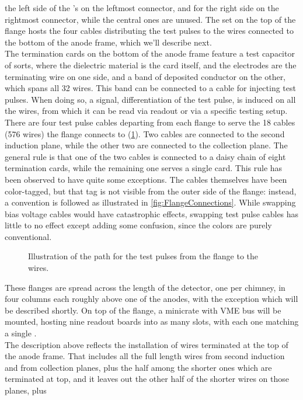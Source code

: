 the left side of the \DBB's on the leftmost connector, and for the right side on
the rightmost connector, while the central ones are unused.
The set on the top of the flange hosts the four cables distributing the test
pulses to the wires connected to the bottom of the anode frame, which we'll
describe next.
\\
The termination cards on the bottom of the anode frame feature a test capacitor
of sorts, where the dielectric material is the card itself, and the electrodes
are the terminating wire on one side, and a band of deposited conductor on the
other, which spans all 32 wires.
This band can be connected to a cable for injecting test pulses.
When doing so, a signal, differentiation of the test pulse, is induced on all
the wires, from which it can be read via readout or via a specific testing
setup.
There are four test pulse cables departing from each flange to serve the 18
cables (576 wires) the flange connects to (\cref{fig:PulseCables}).
Two cables are connected to the second induction plane, while the other two are
connected to the collection plane.
The general rule is that one of the two cables is connected to a daisy chain of
eight termination cards, while the remaining one serves a single card.
This rule has been observed to have quite some exceptions.
The cables themselves have been color-tagged, but that tag is not visible from
the outer side of the flange: instead, a convention is followed as illustrated
in \cref{fig:FlangeConnections}.
While swapping bias voltage cables would have catastrophic effects, swapping
test pulse cables has little to no effect except adding some confusion, since
the colors are purely conventional.
\begin{figure}
  \caption{\label{fig:PulseCables}
    Illustration of the path for the test pulses from the flange to the wires.
  }
\end{figure}
These flanges are spread across the length of the detector, one per chimney,
in four columns each roughly above one of the anodes, with the exception which
will be described shortly.
On top of the flange, a minicrate with VME bus will be mounted, hosting nine
readout boards into as many slots, with each one matching a single \DBB.
\\
The description above reflects the installation of wires terminated at the top
of the anode frame.
That includes all the full length wires from second induction and from
collection planes, plus the half among the shorter ones which are terminated at
top, and it leaves out the other half of the shorter wires on those planes, plus
